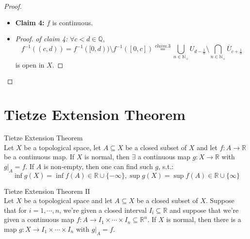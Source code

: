 \begin{proof}
\begin{itemize}
\begin{itemize}
\begin{proof}
\begin{itemize}
                    \item $f^{-1}([0,r)) = f ^{-1} (\bigcup_{n \in \mathbb{N}_+} [0,r- \frac{1}{n})) = \bigcup_{n \in \mathbb{N}_+} f^{-1} ([0,r- \frac{1}{n})) \overset{claim.2.2}{\subseteq} \bigcup_{n \in \mathbb{N}_+} U_{r- \frac{1}{n}} \subseteq \bigcup_{n \in \mathbb{N}_+} \overline{U}_{r- \frac{1}{n}} \overset{claim.2.1}{\subseteq} \bigcup_{n \in \mathbb{N}_+} f^{-1} ([0,r -\frac{1}{n}]) = f^{-1}(\bigcup_{n \in \mathbb{N}_+} [0,r- \frac{1}{n}]) = f^{-1} ([0,r))$.
                \end{itemize}
            \end{proof}

            \item \textbf{Claim 4:} $f$ is continuous.
            \item \begin{proof}
                \textit{of claim 4:} $\forall c<d \in \mathbb{Q}$,
                $$f^{-1} ((c,d)) = f^{-1} ([0,d)) \setminus f^{-1} ([0,c]) \overset{claim.3}{=} \bigcup_{n \in \mathbb{N}_+} U_{d-\frac{1}{n}} \setminus \bigcap_{n \in \mathbb{N}_+} \overline{U}_{c+\frac{1}{n}}$$
                is open in $X$.
            \end{proof}
        \end{itemize}
    \end{itemize}
\end{proof}

\section{Tietze Extension Theorem}

\begin{theorem}{Tietze Extension Theorem}\\
Let $X$ be a topological space, let $A \subseteq X$ be a closed subset of $X$ and let $f: A \to \mathbb{R}$ be a continuous map. If $X$ is normal, then $\exists$ a continuous map $g: X \to \mathbb{R}$ with $g|_A=f$. If $A$ is non-empty, then one can find such $g$, s.t.:
$$\inf g(X)=\inf f(A) \in \mathbb{R} \cup \{-\infty\}, \sup g(X)= \sup f(A) \in \mathbb{R} \cup \{\infty \}$$
\end{theorem}

\begin{theorem}{Tietze Extension Theorem $\mathrm{II}$}\\
Let $X$ be a topological space and let $A \subseteq X$ be a closed subset of $X$. Suppose that for $i= 1,\cdots, n$, we're given a closed interval $I_i \subseteq \mathbb{R}$ and suppose that we're given a continuous map $f: A \to I_1 \times \cdots \times I_n \subseteq \mathbb{R}^n$. If $X$ is normal, then there is a map $g: X \to I_1 \times \cdots \times I_n$ with $g|_A =f$.
\end{theorem}




